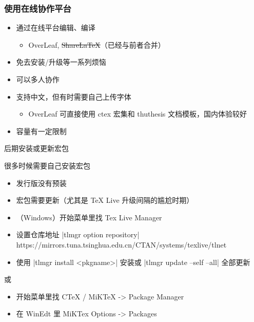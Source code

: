\begin{frame}[fragile]
  \frametitle{使用在线协作平台}
  \begin{itemize}
    \item 通过在线平台编辑、编译
      \begin{itemize}
        \item OverLeaf, \sout{ShareLaTeX}（已经与前者合并）
      \end{itemize}
    \item 免去安装/升级等一系列烦恼
    \item 可以多人协作
    \item 支持中文，但有时需要自己上传字体
      \begin{itemize}
        \item OverLeaf 可直接使用 ctex 宏集和 thuthesis 文档模板，国内体验较好
      \end{itemize}
    \item 容量有一定限制
  \end{itemize}
\end{frame}


\begin{frame}{后期安装或更新宏包}
  \begin{exampleblock}{很多时候需要自己安装宏包}
    \begin{itemize}
      \item 发行版没有预装
      \item 宏包需要更新（尤其是 TeX Live 升级间隔的尴尬时期）
    \end{itemize}
  \end{exampleblock}
  \begin{exampleblock}{\TL}
    \begin{itemize}
      \item （Windows）开始菜单里找 Tex Live Manager
      \item 设置仓库地址 |tlmgr option repository| {\footnotesize\ttfamily
        https://mirrors.tuna.tsinghua.edu.cn/CTAN/systems/texlive/tlnet}
      \item 使用 |tlmgr install <pkgname>| 安装或 |tlmgr update --self --all| 全部更新
    \end{itemize}
  \end{exampleblock}
  \begin{exampleblock}{\CTeX 或 \MiKTeX}
    \begin{itemize}
      \item 开始菜单里找 CTeX / MiKTeX -> Package Manager
      \item 在 WinEdt 里 MiKTex Options -> Packages
    \end{itemize}
  \end{exampleblock}
\end{frame}

